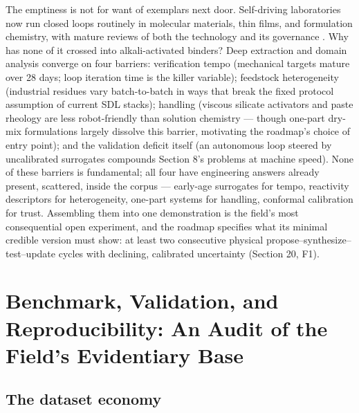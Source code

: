\documentclass[pdflatex,sn-basic]{sn-jnl}
\begin{document}
The emptiness is not for want of exemplars next door. Self-driving laboratories now run closed loops routinely in molecular materials, thin films, and formulation chemistry, with mature reviews of both the technology and its governance \citep{tom2024}. Why has none of it crossed into alkali-activated binders? Deep extraction and domain analysis converge on four barriers: verification tempo (mechanical targets mature over 28 days; loop iteration time is the killer variable); feedstock heterogeneity (industrial residues vary batch-to-batch in ways that break the fixed protocol assumption of current SDL stacks); handling (viscous silicate activators and paste rheology are less robot-friendly than solution chemistry --- though one-part dry-mix formulations largely dissolve this barrier, motivating the roadmap's choice of entry point); and the validation deficit itself (an autonomous loop steered by uncalibrated surrogates compounds Section 8's problems at machine speed). None of these barriers is fundamental; all four have engineering answers already present, scattered, inside the corpus --- early-age surrogates for tempo, reactivity descriptors for heterogeneity, one-part systems for handling, conformal calibration for trust. Assembling them into one demonstration is the field's most consequential open experiment, and the roadmap specifies what its minimal credible version must show: at least two consecutive physical propose--synthesize--test--update cycles with declining, calibrated uncertainty (Section 20, F1).

\section{Benchmark, Validation, and Reproducibility: An Audit of the Field's Evidentiary Base}

\subsection{The dataset economy}
\end{document}
